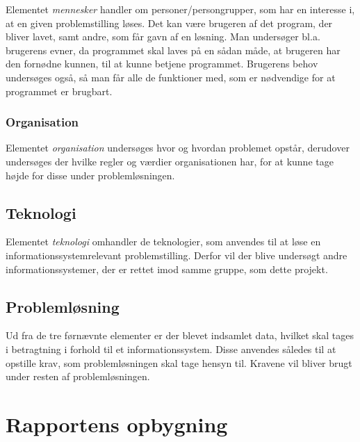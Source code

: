 Elementet \textit{mennesker} handler om personer/persongrupper, som har en interesse i, at en given problemstilling løses. 
Det kan være brugeren af det program, der bliver lavet, samt andre, som får gavn af en løsning.
Man undersøger bl.a. brugerens evner, da programmet skal laves på en sådan måde, at brugeren har den fornødne kunnen, til at kunne betjene programmet.
Brugerens behov undersøges også, så man får alle de funktioner med, som er nødvendige for at programmet er brugbart.


\subsubsection{Organisation}\label{subsec:organisation}

Elementet \textit{organisation} undersøges hvor og hvordan problemet opstår, derudover undersøges der hvilke regler og værdier organisationen har, for at kunne tage højde for disse under problemløsningen. 


\subsection{Teknologi}\label{subsec:Teknologi}

Elementet \textit{teknologi} omhandler de teknologier, som anvendes til at løse en informationssystemrelevant problemstilling.
Derfor vil der blive undersøgt andre informationssystemer, der er rettet imod samme gruppe, som dette projekt.


\subsection{Problemløsning}
Ud fra de tre førnævnte elementer er der blevet indsamlet data, hvilket skal tages i betragtning i forhold til et informationssystem.
Disse anvendes således til at opstille krav, som problemløsningen skal tage hensyn til. 
Kravene vil bliver brugt under resten af problemløsningen.


\section{Rapportens opbygning}\label{sec:rapportens-opbygning}

